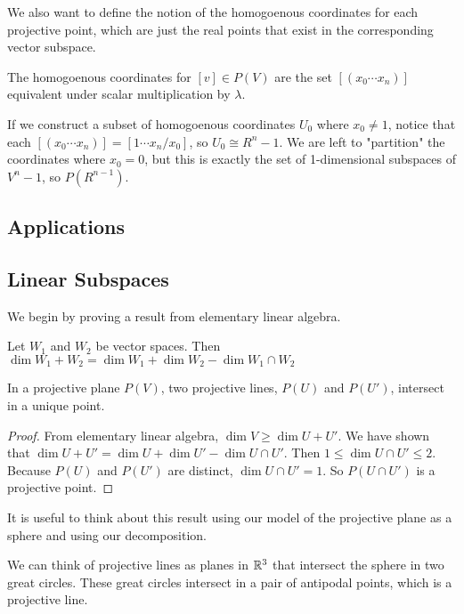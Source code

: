 \documentclass[10pt]{article}
\begin{document}
We also want to define the notion of the homogoenous coordinates for each
projective point, which are just the real points that exist in the
corresponding vector subspace.

\begin{definition}
	The homogoenous coordinates for $[v] \in P(V)$ are the set $[(x_0 \cdots x_n)]$ equivalent under scalar multiplication by $\lambda$.
\end{definition}

If we construct a subset of homogoenous coordinates $U_0$ where $x_0 \neq 1$,
notice that each $[(x_0 \cdots x_n)] = [1 \cdots x_n / x_0]$, so $U_0 \cong
R^n-1$. We are left to "partition" the coordinates where $x_0 = 0$, but this is
exactly the set of 1-dimensional subspaces of $V^n-1$, so $P(R^{n-1})$.

\subsection{Applications}


\subsection{Linear Subspaces}

We begin by proving a result from elementary linear algebra.


\begin{theorem}
	Let $W_1$ and $W_2$ be vector spaces. Then $\dim W_1 + W_2 = \dim W_1 + \dim W_2 - \dim W_1 \cap W_2$ 
\end{theorem}

\begin{theorem}
	In a projective plane $P(V)$, two projective lines, $P(U)$ and $P(U')$, intersect in a unique point.
\end{theorem}
\begin{proof}
	From elementary linear algebra, $\dim V \geq \dim U + U'$. We have shown that $\dim U + U' = \dim U + \dim U' - \dim {U \cap U'}$.
	Then $1 \leq \dim {U \cap U'} \leq 2$. Because $P(U)$ and $P(U')$ are distinct, $\dim {U \cap U'} = 1$. So $P(U \cap U')$ is a projective point.
\end{proof}

It is useful to think about this result using our model of the projective plane as a sphere and using our decomposition.

We can think of projective lines as planes in $\mathbb{R}^3$ that intersect the sphere
in two great circles. These great circles intersect in a pair of antipodal
points, which is a projective line.
\end{document}
